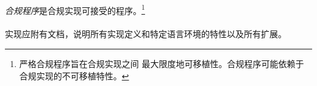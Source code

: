 \paragraph{}
\textit{合规程序}是合规实现可接受的程序。\footnote{严格合规程序旨在合规实现之间
最大限度地可移植性。合规程序可能依赖于合规实现的不可移植特性。}

\paragraph{}
实现应附有文档，说明所有实现定义和特定语言环境的特性以及所有扩展。

